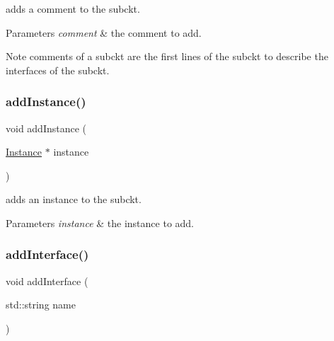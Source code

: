 adds a comment to the subckt. 


\begin{DoxyParams}{Parameters}
{\em comment} & the comment to add.\\
\hline
\end{DoxyParams}
\begin{DoxyNote}{Note}
comments of a subckt are the first lines of the subckt to describe the interfaces of the subckt. 
\end{DoxyNote}
\mbox{\label{class_s_p_i_c_e_1_1_subckt_a7bb4a4532643568ab1ac2c229185a88e}} 
\subsubsection{\texorpdfstring{add\+Instance()}{addInstance()}}
{\footnotesize\ttfamily void add\+Instance (\begin{DoxyParamCaption}\item[{\hyperlink{class_s_p_i_c_e_1_1_instance}{Instance} $\ast$}]{instance }\end{DoxyParamCaption})\hspace{0.3cm}{\ttfamily [inline]}}



adds an instance to the subckt. 


\begin{DoxyParams}{Parameters}
{\em instance} & the instance to add. \\
\hline
\end{DoxyParams}
\mbox{\label{class_s_p_i_c_e_1_1_subckt_ac162264683fa3d9b3384d3e8cc291fa2}} 
\subsubsection{\texorpdfstring{add\+Interface()}{addInterface()}}
{\footnotesize\ttfamily void add\+Interface (\begin{DoxyParamCaption}\item[{std\+::string}]{name }\end{DoxyParamCaption})\hspace{0.3cm}{\ttfamily [inline]}}



